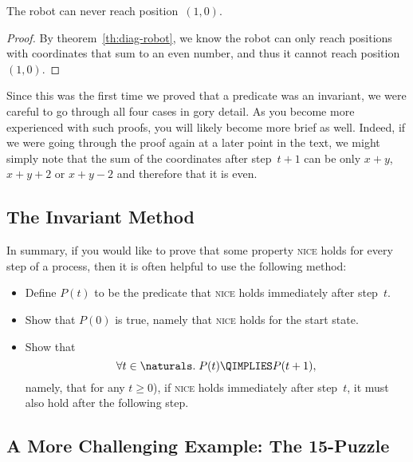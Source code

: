 \begin{corollary}\label{cor:diag-robot}
The robot can never reach position~$(1, 0)$.
\end{corollary}

\begin{proof}
By theorem~\ref{th:diag-robot}, we know the robot can only reach
positions with coordinates that sum to an even number, and thus it
cannot reach position~$(1, 0)$.
\end{proof}

Since this was the first time we proved that a predicate was an
invariant, we were careful to go through all four cases in gory
detail.  As you become more experienced with such proofs, you will
likely become more brief as well.  Indeed, if we were going through
the proof again at a later point in the text, we might simply note
that the sum of the coordinates after step~$t + 1$ can be only $x +
y$, $x + y + 2$ or $x + y - 2$ and therefore that it is even.

\subsection{The Invariant Method}

In summary, if you would like to prove that some property
\textsc{nice} holds for every step of a process, then it is often
helpful to use the following method:
\begin{itemize}

\item
Define $P(t)$ to be the predicate that \textsc{nice} holds immediately
after step~$t$.

\item
Show that $P(0)$ is true, namely that \textsc{nice} holds for the
start state.

\item
Show that
\begin{equation*}
    \forall t \in \naturals. \; P(t) \QIMPLIES P(t + 1),
\end{equation*}
namely, that for any $t \ge 0$), if \textsc{nice} holds immediately
after step~$t$, it must also hold after the following step.

\end{itemize}

\subsection{A More Challenging Example: The
  15-Puzzle}\label{sec:15puzzle}

